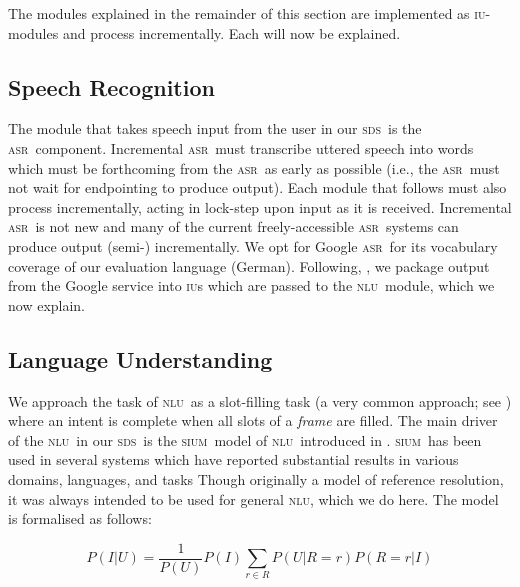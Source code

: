 \documentclass[11pt]{article}
\newcommand{\sds}[0]{\textsc{sds}}
\newcommand{\nlu}[0]{\textsc{nlu}}
\newcommand{\sium}[0]{\textsc{sium}}
\newcommand{\asr}[0]{\textsc{asr}}
\newcommand{\iu}[0]{\textsc{iu}}
\begin{document}
The modules explained in the remainder of this section are implemented as \iu-modules and process incrementally. Each will now be explained. 

\subsection{Speech Recognition}

The module that takes speech input from the user in our \sds\ is the \asr\ component. Incremental \asr\ must transcribe uttered speech into words which must be forthcoming from the \asr\ as early as possible (i.e., the \asr\ must not wait for endpointing to produce output). Each module that follows must also process incrementally, acting in lock-step upon input as it is received. Incremental \asr\ is not new \cite{baumannetal2009:naacl} and many of the current freely-accessible \asr\ systems can produce output (semi-) incrementally. We opt for Google \asr\ for its vocabulary coverage of our evaluation language (German). Following, , we package output from the Google service into \iu s which are passed to the \nlu\ module, which we now explain. 

\subsection{Language Understanding}

We approach the task of \nlu\ as a slot-filling task (a very common approach; see ) where an intent is complete when all slots of a \emph{frame} are filled. The main driver of the \nlu\ in our \sds\ is the \sium\ model of \nlu\ introduced in . \sium\ has been used in several systems which have reported substantial results in various domains, languages, and tasks \cite{Han2015,Kennington2015_naacl,Kennington2016} Though originally a model of reference resolution, it was always intended to be used for general \nlu, which we do here. The model is formalised as follows:

\vspace{-0.25cm}
{\small
\begin{center}
\begin{equation}
   P(I|U) = \frac{1}{P(U)} P(I)\sum_{r\in R} P(U|R=r)P(R=r|I) 
\label{eq:disc1}
\end{equation}
\end{center}
}
\end{document}
